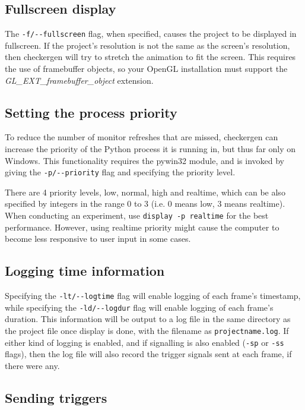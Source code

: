 \documentclass[12pt,titlepage]{article}
\begin{document}
\subsection{Fullscreen display}

The \lstinline{-f/--fullscreen} flag, when specified, causes the
project to be displayed in fullscreen. If the project's resolution is
not the same as the screen's resolution, then checkergen will try to
stretch the animation to fit the screen. This requires the use of
framebuffer objects, so your OpenGL installation must support the
\emph{GL\_EXT\_framebuffer\_object} extension.

\subsection{Setting the process priority}

To reduce the number of monitor refreshes that are missed, checkergen
can increase the priority of the Python process it is running in, but
thus far only on Windows. This functionality requires the pywin32
module, and is invoked by giving the \lstinline{-p/--priority} flag
and specifying the priority level.

There are 4 priority levels, low, normal, high and realtime, which can
be also specified by integers in the range 0 to 3 (i.e. 0 means low, 3
means realtime). When conducting an experiment, use 
\lstinline{display -p realtime} for the best performance. However, using
realtime priority might cause the computer to become less responsive
to user input in some cases.

\subsection{Logging time information}
Specifying the \lstinline{-lt/--logtime} flag will enable logging of
each frame's timestamp, while specifying the \lstinline{-ld/--logdur}
flag will enable logging of each frame's duration. This information
will be output to a log file in the same directory as the project file
once display is done, with the filename as
\texttt{projectname.log}. If either kind of logging is enabled, and if
signalling is also enabled (\lstinline{-sp} or \lstinline{-ss} flags),
then the log file will also record the trigger signals sent at each
frame, if there were any.

\subsection{Sending triggers}
\end{document}
